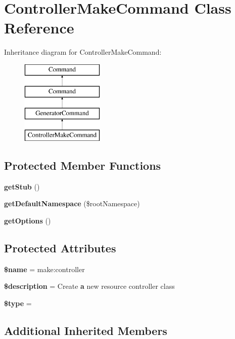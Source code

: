 \section{Controller\+Make\+Command Class Reference}
\label{class_illuminate_1_1_routing_1_1_console_1_1_controller_make_command}
Inheritance diagram for Controller\+Make\+Command\+:\begin{figure}[H]
\begin{center}
\leavevmode
\includegraphics[height=4.000000cm]{class_illuminate_1_1_routing_1_1_console_1_1_controller_make_command}
\end{center}
\end{figure}
\subsection*{Protected Member Functions}
\begin{DoxyCompactItemize}
\item 
{\bf get\+Stub} ()
\item 
{\bf get\+Default\+Namespace} (\$root\+Namespace)
\item 
{\bf get\+Options} ()
\end{DoxyCompactItemize}
\subsection*{Protected Attributes}
\begin{DoxyCompactItemize}
\item 
{\bf \$name} = \textquotesingle{}make\+:controller\textquotesingle{}
\item 
{\bf \$description} = \textquotesingle{}Create {\bf a} new resource controller class\textquotesingle{}
\item 
{\bf \$type} = \textquotesingle{}
\end{DoxyCompactItemize}
\subsection*{Additional Inherited Members}


